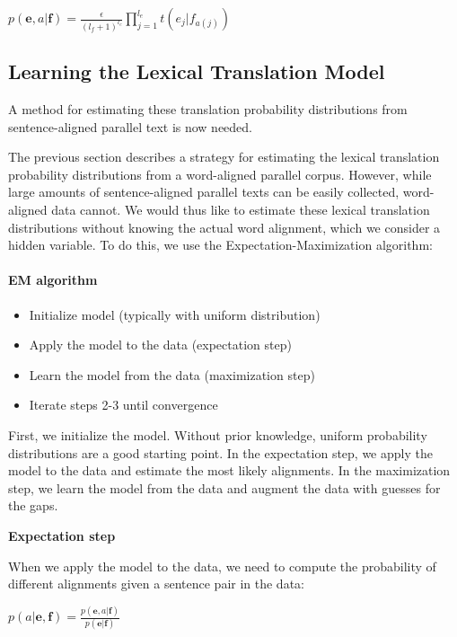 \documentclass[10pt]{report}
\theoremstyle{plain}
\begin{document}
{\begin{center}
$p(\textbf{e},a|\textbf{f}) = \frac{\epsilon}{(l_f +
1)^{l_e}}\prod_{j=1}^{l_e} t(e_j|f_{a(j)})$
\end{center}


\subsection{Learning the Lexical Translation Model}

A method for estimating these translation probability distributions
from sentence-aligned parallel text is now needed.

The previous section describes a strategy for estimating the lexical
translation probability distributions from a word-aligned parallel
corpus. However, while large amounts of sentence-aligned parallel
texts can be easily collected, word-aligned data cannot. We would
thus like to estimate these lexical translation distributions
without knowing the actual word alignment, which we consider a
hidden variable. To do this, we use the Expectation-Maximization
algorithm:

\paragraph{EM algorithm}
\begin{itemize}
\item{Initialize model (typically with uniform distribution)}
\item{Apply the model to the data (expectation step)}
\item{Learn the model from the data (maximization step)}
\item{Iterate steps 2-3 until convergence}
\end{itemize}

First, we initialize the model. Without prior knowledge, uniform
probability distributions are a good starting point. In the
expectation step, we apply the model to the data and estimate the
most likely alignments. In the maximization step, we learn the model
from the data and augment the data with guesses for the gaps.

 \textbf{Expectation step\\}

When we apply the model to the data, we need to compute the
probability of different alignments given a sentence pair in the
data:

\begin{center}
$p(a|\textbf{e},\textbf{f}) =
\frac{p(\textbf{e},a|\textbf{f})}{p(\textbf{e}|\textbf{f})}$
\end{center}

}
\end{document}
